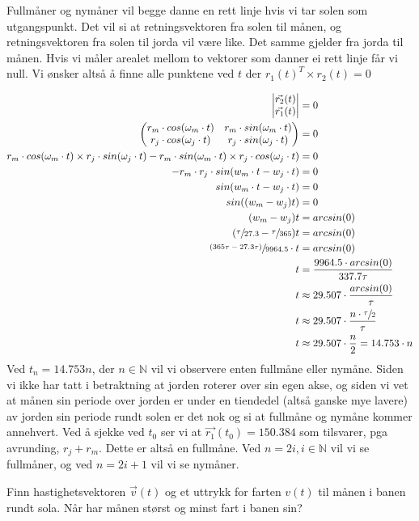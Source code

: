 \documentclass{../../myassignment}
\begin{document}
	\begin{answer}
		Fullm{\aa}ner og nym{\aa}ner vil begge danne en rett linje hvis vi tar solen som utgangspunkt. Det vil si at retningsvektoren fra solen til m{\aa}nen, og retningsvektoren fra solen til jorda vil v{\ae}re like. Det samme gjelder fra jorda til m{\aa}nen. Hvis vi m{\aa}ler arealet mellom to vektorer som danner ei rett linje f{\aa}r vi null. Vi {\o}nsker alts{\aa} {\aa} finne alle punktene ved $t$ der ${r_1(t)}^T \times {r_2}(t) = 0$

		\begin{align*}
			\begin{vmatrix}{\vec{r_2}(t)} \\ \vec{r_1}(t) \end{vmatrix} &= 0\\
			\begin{pmatrix} r_m\cdot cos(\omega_m \cdot t) & r_m \cdot sin(\omega_m \cdot t) \\ r_j\cdot cos(\omega_j \cdot t) & r_j \cdot sin(\omega_j \cdot t) \end{pmatrix} &= 0 \\
			r_m\cdot cos(\omega_m \cdot t) \times r_j \cdot sin(\omega_j \cdot t) - r_m \cdot sin(\omega_m \cdot t) \times r_j\cdot cos(\omega_j \cdot t) &= 0 \\
			-r_m \cdot r_j \cdot sin(w_m \cdot t - w_j \cdot t) &= 0 \\
			sin(w_m \cdot t - w_j \cdot t) &= 0 \\
			sin((w_m - w_j)t) &= 0 \\
			(w_m - w_j)t &= arcsin(0) \\
			(\sfrac{\tau}{27.3} - \sfrac{\tau}{365})t &= arcsin(0) \\
			\sfrac{(365\tau - 27.3\tau)}{9964.5} \cdot t &= arcsin(0) \\
			t &= \dfrac{9964.5 \cdot arcsin(0)}{337.7\tau} \\
			t &\approx 29.507 \cdot \dfrac{arcsin(0)}{\tau} \\
			t &\approx 29.507 \cdot \dfrac{n \cdot \sfrac{\tau}{2}}{\tau} \\
			t &\approx 29.507 \cdot \dfrac{n}{2} = 14.753\cdot n \\
		\end{align*}
		Ved $t_n = 14.753n$, der $n \in \mathbb{N}$ vil vi observere enten fullm{\aa}ne eller nym{\aa}ne. Siden vi ikke har tatt i betraktning at jorden roterer over sin egen akse, og siden vi vet at m{\aa}nen sin periode over jorden er under en tiendedel (alts{\aa} ganske mye lavere) av jorden sin periode rundt solen er det nok og si at fullm{\aa}ne og nym{\aa}ne kommer annehvert. Ved {\aa} sjekke ved $t_0$ ser vi at $\vec{r_1}(t_0) = 150.384$ som tilsvarer, pga avrunding, $r_j + r_m$. Dette er alts{\aa} en fullm{\aa}ne. Ved $n=2i, i\in\mathbb{N}$ vil vi se fullm{\aa}ner, og ved $n=2i+1$ vil vi se nym{\aa}ner.

	\end{answer}

	\begin{problem}
		Finn hastighetsvektoren $\vec{v}(t)$ og et uttrykk for farten $v(t)$ til månen i banen rundt sola. Når har månen størst og minst fart i banen sin?
	\end{problem}
\end{document}
